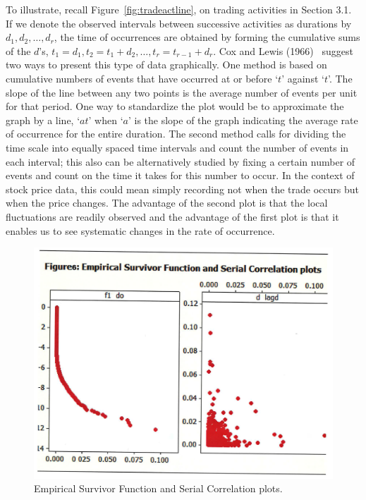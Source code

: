 To illustrate, recall Figure~\ref{fig:tradeactline}, on trading activities in Section 3.1. If we denote the observed intervals between successive activities as durations by $d_1, d_2, \ldots,d_r$, the time of occurrences are obtained by forming the cumulative sums of the $d$'s, $t_1= d_1, t_2= t_1 + d_2, \ldots, t_r=t_{r-1} + d_r$. Cox and Lewis (1966)~\cite{cox1966} suggest two ways to present this type of data graphically. One method is based on cumulative numbers of events that have occurred at or before `$t$' against `$t$'. The slope of the line between any two points is the average number of events per unit for that period. One way to standardize the plot would be to approximate the graph by a line, `$at$' when `$a$' is the slope of the graph indicating the average rate of occurrence for the entire duration. The second method calls for dividing the time scale into equally spaced time intervals and count the number of events in each interval; this also can be alternatively studied by fixing a certain number of events and count on the time it takes for this number to occur. In the context of stock price data, this could mean simply recording not when the trade occurs but when the price changes. The advantage of the second plot is that the local fluctuations are readily observed and the advantage of the first plot is that it enables us to see systematic changes in the rate of occurrence.
 
 	\begin{figure}[!ht]
	\centering	
	\includegraphics[width=\textwidth]{chapters/chapter_advanced/figures/Sec2-10Fig6.png}
	\caption{Empirical Survivor Function and Serial Correlation plots. \label{fig:survivor}}
	\end{figure}
	
